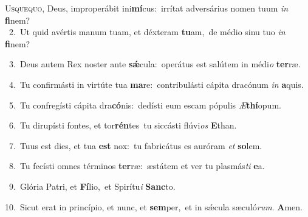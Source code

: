 \lettrine{\initial\textcolor{\initialcolor}{U}}{squequo,} Deus, improperábit ini\-\textbf{mí}\-cus:~\star irrítat adversárius nomen tuum \textit{in} \textbf{fi}\-nem?\\
{\numbfont\textcolor{\numbcolor}{~2.}}~Ut quid avértis manum tuam, et déxteram \textbf{tu}\-am,~\star de médio sinu tuo \textit{in} \textbf{fi}\-nem?\par
{\numbfont\textcolor{\numbcolor}{~3.}}~Deus autem Rex noster ante \textbf{sǽ}\-cula:~\star operátus est salútem in médi\textit{o} \textbf{ter}\-ræ.\par
{\numbfont\textcolor{\numbcolor}{~4.}}~Tu confirmásti in virtúte tua \textbf{ma}\-re:~\star contribulásti cápita dracónum \textit{in} \textbf{a}\-quis.\par
{\numbfont\textcolor{\numbcolor}{~5.}}~Tu confregísti cápita dra\-\textbf{có}\-nis:~\star dedísti eum escam pópulis \textit{Æ}\-\textbf{thí}opum.\par
{\numbfont\textcolor{\numbcolor}{~6.}}~Tu dirupísti fontes, et tor\-\textbf{rén}\-tes~\star tu siccásti flúvi\textit{os} \textbf{E}\-than.\par
{\numbfont\textcolor{\numbcolor}{~7.}}~Tuus est dies, et tua \textbf{est} nox:~\star tu fabricátus es auróram \textit{et} \textbf{so}\-lem.\par
{\numbfont\textcolor{\numbcolor}{~8.}}~Tu fecísti omnes términos \textbf{ter}\-ræ:~\star æstátem et ver tu plasmás\textit{ti} \textbf{e}\-a.\par
{\numbfont\textcolor{\numbcolor}{~9.}}~Glória Patri, et \textbf{Fí}\-lio,~\star et Spirítu\textit{i} \textbf{Sanc}\-to.\par
{\numbfont\textcolor{\numbcolor}{10.}}~Sicut erat in princípio, et nunc, et \textbf{sem}\-per,~\star et in sǽcula sæculó\-\textit{rum}\-. \textbf{A}\-men.\par
